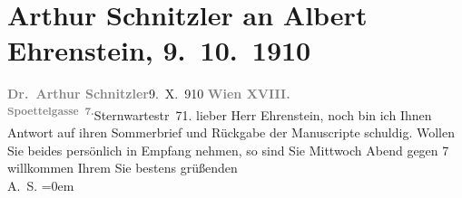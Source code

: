 

         
         \renewcommand{\erwaehntePersonen}{Personen: Albert Ehrenstein}
         \renewcommand{\erwaehnteOrte}{Orte: Edmund-Weiß-Gasse, Sternwartestraße, Wien, XVIII., Währing}
         \renewcommand{\erwaehnteWerke}{Werke: Graf Cilli}
               \section[Arthur Schnitzler an Albert Ehrenstein, 9. 10. 1910]{ Arthur Schnitzler an Albert Ehrenstein, 9. 10. 1910}\nopagebreak{}\rehead{ }\begin{ledgroupsized}[t]{13cm}\normalsize\beginnumbering \toendnotes[C]{\smallbreak\pagebreak[2]} 
\toendnotes[C]{\smallbreak}\pstart
           {\pb}\textcolor{gray}{\textbf{Dr. Arthur Schnitzler}}\hfill 9. X. 910\pend
           \pstart
           \textcolor{gray}{\textbf{Wien XVIII.}}{ }\substVorne{}\textsuperscript{\textcolor{gray}{\textbf{Spoettelgasse 7.}}}{\allowbreak}\substDazwischen{}Sternwartestr 71.\substHinten{}\pend
           \pstart{}lieber Herr Ehrenstein,\pend\pstart
           noch bin ich Ihnen Antwort auf ihren Sommerbrief und Rückgabe der Manuscripte
               schuldig. Wollen Sie beides
                    persönlich in Empfang nehmen, so sind Sie Mittwoch Abend gegen 7
                    willkommen\pend
           \pstart
           Ihrem Sie bestens grüßenden{\\[\baselineskip]}\spacefill\mbox{A. S.}\pend
           \leftskip=0em{}
         
         \endnumbering{}\end{ledgroupsized}  \newcommand{\dateiname}{L01965}\newcommand{\titel}{Arthur Schnitzler an Albert Ehrenstein, 9. 10. 1910}\newcommand{\editorInnen}{Martin Anton Müller und Gerd-Hermann Susen}
      